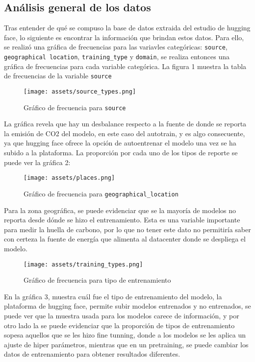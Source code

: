 \documentclass[journal]{IEEEtran}
\begin{document}
	\subsection{Análisis general de los datos}
	Tras entender de qué se compuso la base de datos extraida del estudio de hugging face, lo siguiente es encontrar la información que brindan estos datos. Para ello, se realizó una gráfica de frecuencias para las variavles categóricas: \texttt{source}, \texttt{geographical location}, \texttt{training\_type} y \texttt{domain}, se realiza entonces una gráfica de frecuencias para cada variable categórica. La figura 1 muestra la tabla de frecuencias de la variable \texttt{source}
	\begin{figure}[H]
		\centering
		\texttt{[image: assets/source\_types.png]}
		\caption{Gráfico de frecuencia para  \texttt{source}}
		\label{fig:pca_scatter}
	\end{figure}
	La gráfica revela que hay un desbalance respecto a la fuente de donde se reporta la emisión de CO2 del modelo, en este caso del autotrain, y es algo consecuente, ya que hugging face ofrece la opción de autoentrenar el modelo una vez se ha subido a la plataforma. La proporción por cada uno de los tipos de reporte se puede ver la gráfica 2:
	\begin{figure}[H]
		\centering
		\texttt{[image: assets/places.png]}
		\caption{Gráfico de frecuencia para  \texttt{geographical\_location}}
		\label{fig:pca_scatter}
	\end{figure}
	Para la zona geográfica, se puede evidenciar que se la mayoría de modelos no reporta desde dónde se hizo el entrenamiento. Esta es una variable importante para medir la huella de carbono, por lo que no tener este dato no permitiría saber con certeza la fuente de energía que alimenta al datacenter donde se despliega el modelo.
	\begin{figure}[H]
		\centering
		\texttt{[image: assets/training\_types.png]}

		\caption{Gráfico de frecuencia para  tipo de entrenamiento}
		\label{fig:pca_scatter}
	\end{figure}
	En la gráfica 3, muestra cuál fue el tipo de entrenamiento del modelo, la plataforma de hugging face, permite subir modelos entrenados y no entrenados, se puede ver que la muestra usada para los modelos carece de información, y por otro lado la se puede evidenciar que la proporción de tipos de entrenamiento sopesa aquellos que se les hizo fine tunning, donde a los modelos se les aplica un ajuste de hiper parámetros, mientras que en un pretraining, se puede cambiar los datos de entrenamiento para obtener resultados diferentes.
\end{document}
